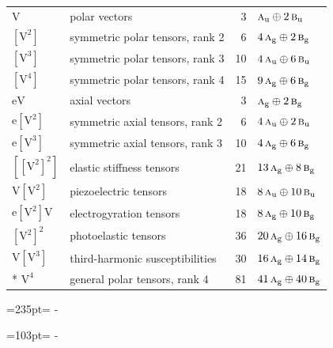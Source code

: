 \documentclass[10pt,a4paper]{article}
\newcommand{\needspace}[1]{\par\penalty-100\begingroup\dimen0=#1\relax\dimen2=\pagegoal
  \advance\dimen2-\pagetotal\ifdim\dimen0>\dimen2\relax\ifdim\dimen2>0pt\vfil\break\fi\fi
  \endgroup}
\numberwithin{equation}{section}
\newcommand{\irr}[1]{\text{\normalfont\scshape #1}}
\newcommand{\ptag}[1]{\mathrm{#1}}
\newcommand{\jahn}[1]{\mathrm{#1}}
\newlength{\fillwidth}\newlength{\cellwidth}\newlength{\colwidth}
\begin{document}
{\begin{longtable}{@{}llr>{\RaggedRight\arraybackslash}p{\fillwidth}@{}}
$\jahn{V}$ & polar vectors & 3 & $\irr{a}_{\ptag{u}} \oplus\allowbreak 2\,\irr{b}_{\ptag{u}}$\\
$\jahn{[V^{2}]}$ & symmetric polar tensors, rank 2 & 6 & $4\,\irr{a}_{\ptag{g}} \oplus\allowbreak 2\,\irr{b}_{\ptag{g}}$\\
$\jahn{[V^{3}]}$ & symmetric polar tensors, rank 3 & 10 & $4\,\irr{a}_{\ptag{u}} \oplus\allowbreak 6\,\irr{b}_{\ptag{u}}$\\
$\jahn{[V^{4}]}$ & symmetric polar tensors, rank 4 & 15 & $9\,\irr{a}_{\ptag{g}} \oplus\allowbreak 6\,\irr{b}_{\ptag{g}}$\\
$\jahn{eV}$ & axial vectors & 3 & $\irr{a}_{\ptag{g}} \oplus\allowbreak 2\,\irr{b}_{\ptag{g}}$\\
$\jahn{e[V^{2}]}$ & symmetric axial tensors, rank 2 & 6 & $4\,\irr{a}_{\ptag{u}} \oplus\allowbreak 2\,\irr{b}_{\ptag{u}}$\\
$\jahn{e[V^{3}]}$ & symmetric axial tensors, rank 3 & 10 & $4\,\irr{a}_{\ptag{g}} \oplus\allowbreak 6\,\irr{b}_{\ptag{g}}$\\
$\jahn{[[V^{2}]^{2}]}$ & elastic stiffness tensors & 21 & $13\,\irr{a}_{\ptag{g}} \oplus\allowbreak 8\,\irr{b}_{\ptag{g}}$\\
$\jahn{V[V^{2}]}$ & piezoelectric tensors & 18 & $8\,\irr{a}_{\ptag{u}} \oplus\allowbreak 10\,\irr{b}_{\ptag{u}}$\\
$\jahn{e[V^{2}]V}$ & electrogyration tensors & 18 & $8\,\irr{a}_{\ptag{g}} \oplus\allowbreak 10\,\irr{b}_{\ptag{g}}$\\
$\jahn{[V^{2}]^{2}}$ & photoelastic tensors & 36 & $20\,\irr{a}_{\ptag{g}} \oplus\allowbreak 16\,\irr{b}_{\ptag{g}}$\\
$\jahn{V[V^{3}]}$ & third-harmonic susceptibilities & 30 & $16\,\irr{a}_{\ptag{g}} \oplus\allowbreak 14\,\irr{b}_{\ptag{g}}$\\*
$\jahn{V^{4}}$ & general polar tensors, rank 4 & 81 & $41\,\irr{a}_{\ptag{g}} \oplus\allowbreak 40\,\irr{b}_{\ptag{g}}$\\
\bottomrule\end{longtable}}
\needspace{235pt}
\needspace{103pt}
\end{document}
